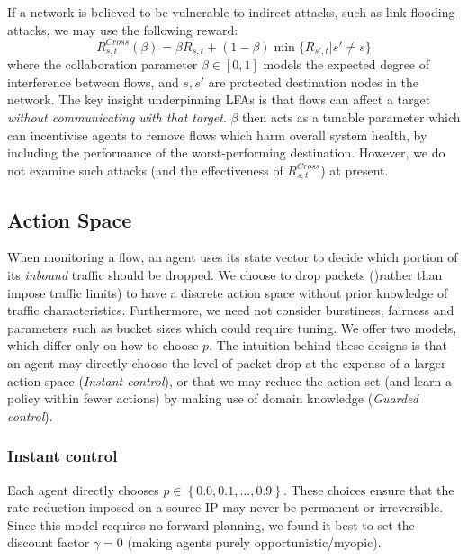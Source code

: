 \documentclass[10pt, times, conference, letterpaper]{IEEEtran}
\begin{document}
If a network is believed to be vulnerable to indirect attacks, such as link-flooding attacks, we may use the following reward:
\begin{equation}
	R_{s,t}^{\mathit{Cross}}(\beta) = \beta R_{s,t} + (1 - \beta) \min{\{R_{s',t} | s' \ne s\}} \label{eqn:lfa-reward}
\end{equation}
where the collaboration parameter $\beta \in [0,1]$ models the expected degree of interference between flows, and $s, s'$ are protected destination nodes in the network.
The key insight underpinning LFAs is that flows can affect a target \emph{without communicating with that target}.
$\beta$ then acts as a tunable parameter which can incentivise agents to remove flows which harm overall system health, by including the performance of the worst-performing destination.
However, we do not examine such attacks (and the effectiveness of $R_{s,t}^{\mathit{Cross}}$) at present.

\subsection{Action Space}
When monitoring a flow, an agent uses its state vector to decide which portion of its \emph{inbound} traffic should be dropped.
We choose to drop packets ()rather than impose traffic limits) to have a discrete action space without prior knowledge of traffic characteristics.
Furthermore, we need not consider burstiness, fairness and parameters such as bucket sizes which could require tuning.
We offer two models, which differ only on how to choose $p$.
The intuition behind these designs is that an agent may directly choose the level of packet drop at the expense of a larger action space (\emph{Instant control}), or that we may reduce the action set (and learn a policy within fewer actions) by making use of domain knowledge (\emph{Guarded control}).

\subsubsection{Instant control}
Each agent directly chooses $p \in \left\{ 0.0, 0.1, \ldots, 0.9 \right\}$.
These choices ensure that the rate reduction imposed on a source IP may never be permanent or irreversible.
Since this model requires no forward planning, we found it best to set the discount factor $\gamma=0$ (making agents purely opportunistic/myopic).
\end{document}
